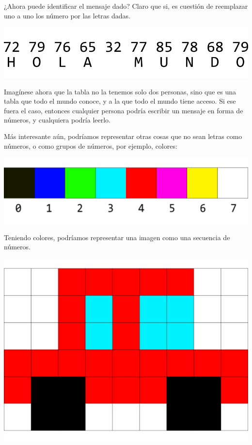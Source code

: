 ¿Ahora puede identificar el mensaje dado? Claro que si, es cuestión de
reemplazar uno a uno los número por las letras dadas.

\centerline{\includegraphics[]{capitulos/bajo_nivel/imagenes/ascii_message_B.png}}

Imagínese ahora que la tabla no la tenemos solo dos personas, sino que es una
tabla que todo el mundo conoce, y a la que todo el mundo tiene acceso. Si ese
fuera el caso, entonces cualquier persona podría escribir un mensaje en forma
de números, y cualquiera podría leerlo.

Más interesante aún, podríamos representar otras cosas que no sean letras como
números, o como grupos de números, por ejemplo, colores:\autocite{msx_1985}

\centerline{\includegraphics[scale=0.8]{capitulos/bajo_nivel/imagenes/palette_3bits.png}}

Teniendo colores, podríamos representar una imagen como una secuencia de números.

\centerline{\includegraphics[scale=0.75]{capitulos/bajo_nivel/imagenes/pixels_car.png}}

